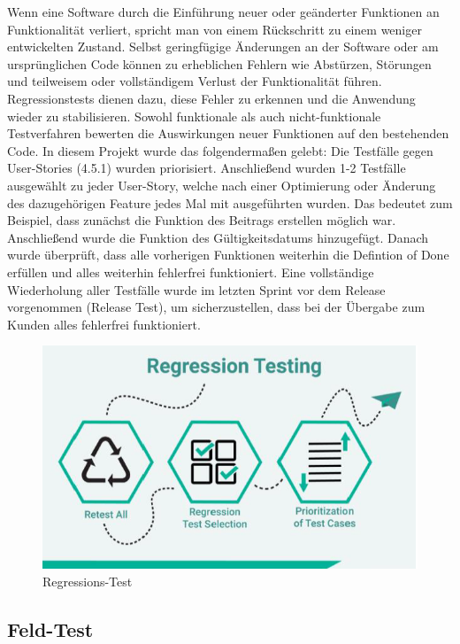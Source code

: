Wenn eine Software durch die Einführung neuer oder geänderter Funktionen an Funktionalität verliert, spricht man von einem Rückschritt zu einem weniger entwickelten Zustand. Selbst geringfügige Änderungen an der Software oder am ursprünglichen Code können zu erheblichen Fehlern wie Abstürzen, Störungen und teilweisem oder vollständigem Verlust der Funktionalität führen.
Regressionstests dienen dazu, diese Fehler zu erkennen und die Anwendung wieder zu stabilisieren. Sowohl funktionale als auch nicht-funktionale Testverfahren bewerten die Auswirkungen neuer Funktionen auf den bestehenden Code.
In diesem Projekt wurde das folgendermaßen gelebt: Die Testfälle gegen User-Stories (4.5.1) wurden priorisiert. Anschließend wurden 1-2 Testfälle ausgewählt zu jeder User-Story, welche nach einer Optimierung oder Änderung des dazugehörigen Feature jedes Mal mit ausgeführten wurden. Das bedeutet zum Beispiel, dass zunächst die Funktion des Beitrags erstellen möglich war. Anschließend wurde die Funktion des Gültigkeitsdatums hinzugefügt. Danach wurde überprüft, dass alle vorherigen Funktionen weiterhin die Defintion of Done erfüllen und alles weiterhin fehlerfrei funktioniert.
Eine vollständige Wiederholung aller Testfälle wurde im letzten Sprint vor dem Release vorgenommen (Release Test), um sicherzustellen, dass bei der Übergabe zum Kunden alles fehlerfrei funktioniert.

\begin{figure}[!htb]
  \centering
  \includegraphics[width=.9\textwidth]{figures/rebecca/Regressions_Test.png}
  \caption[]{Regressions-Test}
  \label{fig:Regressionstest}
\end{figure}

\subsection{Feld-Test}
\label{sub:UmsetzungTestFeld}

